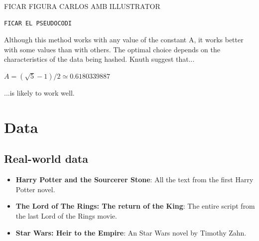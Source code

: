\documentclass[12pt]{article}
\begin{document}
 FICAR FIGURA CARLOS AMB ILLUSTRATOR 
\begin{lstlisting}
FICAR EL PSEUDOCODI
\end{lstlisting}

Although this method works with any value of the constant A, it works better with some values than with others. The optimal choice depends on the characteristics of the data being hashed. Knuth suggest that...

$ A = (\sqrt{5} -1)/2 \simeq 0.6180339887  $

...is likely to work well. 







\section{Data} %

\subsection{Real-world data}
\begin{itemize}
\item \textbf{Harry Potter and the Sourcerer Stone}: All the text from the first Harry Potter novel.
\item \textbf{The Lord of The Rings: The return of the King}: The entire script from the last Lord of the Rings movie.
\item \textbf{Star Wars: Heir to the Empire}:  An Star Wars novel by Timothy Zahn. 
\end{itemize}
\end{document}
